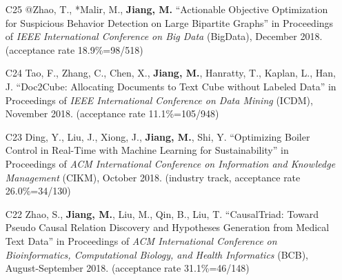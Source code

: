 \documentclass[10pt]{article}
\newenvironment{myindentpar}[1]%
{\begin{list}{}%
         {\setlength{\leftmargin}{#1}}%
         \item[]%
}
{\end{list}}
\newcounter{list}
\newcommand{\hide}[1]{}
\begin{document}
\begin{myindentpar}{0.00cm}
\begin{enumerate}[leftmargin=.5cm]
	\hide{\vspace{-0.1cm}\hspace{0.5cm}{\small \emph{I made 30\% contribution and Mr. Yu made 60\%. I conceived the idea and designed the study. Mr. Yu (junior) implemented the system and did the experiments. Mr. Yu and I wrote the paper.}}}

\item[C25] @Zhao, T., *Malir, M., \textbf{Jiang, M.} ``Actionable Objective Optimization for Suspicious Behavior Detection on Large Bipartite Graphs'' in Proceedings of \emph{IEEE International Conference on Big Data} (BigData), December 2018. (acceptance rate 18.9\%=98/518)

	\hide{\vspace{-0.1cm}\hspace{0.5cm}{\small \emph{I made 40\% contribution and Mr. Zhao made 40\%. I conceived the idea and designed the study. Mr. Zhao implemented the system. Mr. Malir (sophomore) did the experiments. Mr. Zhao and I wrote the paper.}}}

\item[C24] Tao, F., Zhang, C., Chen, X., \textbf{Jiang, M.}, Hanratty, T., Kaplan, L., Han, J. ``Doc2Cube: Allocating Documents to Text Cube without Labeled Data'' in Proceedings of \emph{IEEE International Conference on Data Mining} (ICDM), November 2018. (acceptance rate 11.1\%=105/948)

	\hide{\vspace{-0.1cm}\hspace{0.5cm}{\small \emph{I made 3\% contribution. Mr. Tao conceived the idea in consultation with myself. Mr. Tao did the experiments and wrote the paper.}}}

\item[C23] Ding, Y., Liu, J., Xiong, J., \textbf{Jiang, M.}, Shi, Y. ``Optimizing Boiler Control in Real-Time with Machine Learning for Sustainability'' in Proceedings of \emph{ACM International Conference on Information and Knowledge Management} (CIKM), October 2018. (industry track, acceptance rate 26.0\%=34/130)

	\hide{\vspace{-0.1cm}\hspace{0.5cm}{\small \emph{I made 3\% contribution. Mr. Ding conceived the idea in consultation with myself. Mr. Ding implemented the system, completed the experiments, and wrote the paper.}}}

\item[C22] Zhao, S., \textbf{Jiang, M.}, Liu, M., Qin, B., Liu, T. ``CausalTriad: Toward Pseudo Causal Relation Discovery and Hypotheses Generation from Medical Text Data'' in Proceedings of \emph{ACM International Conference on Bioinformatics, Computational Biology, and Health Informatics} (BCB), August-September 2018. (acceptance rate 31.1\%=46/148)


\end{enumerate}
\end{myindentpar}
\end{document}
